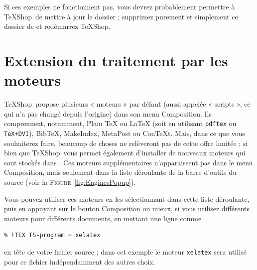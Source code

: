 \documentclass[11pt,french]{article}
\newcommand{\TS}{\textsf{\TeX Shop}}
\newcommand{\mnu}[1]{\textsf{#1}}
\begin{document}
Si ces exemples ne fonctionnent pas, vous devrez probablement permettre à \TS\ de mettre à jour le dossier  ; supprimez purement et simplement ce dossier de  et redémarrez \TS.



\section{Extension du traitement par les moteurs}%

\TS\ propose plusieurs « moteurs » par défaut (aussi appelée « scripts », ce qui n'a pas changé depuis l'origine) dans son menu \mnu{Composition}. Ils comprennent, notamment, \mnu{Plain TeX} ou \mnu{LaTeX} (soit en utilisant \texttt{pdftex} ou \texttt{TeX+DVI}), \mnu{BibTeX}, \mnu{MakeIndex}, \mnu{MetaPost} ou \mnu{ConTeXt}. Mais, dans ce que vous souhaiterez faire, beaucoup de choses ne relèveront pas de cette offre limitée ; si bien que \TS\ vous permet également d'installer de nouveaux moteurs qui sont stockés dans . Ces moteurs supplémentaires n'apparaissent pas dans le menu \mnu{Composition}, mais seulement dans la liste déroulante de la barre d'outils du source (voir la \textsc{Figure}~\ref{fig:EnginesPopup}).

Vous pouvez utiliser ces moteurs en les sélectionnant dans cette liste déroulante, puis en appuyant sur le bouton \mnu{Composition} ou mieux, si vous utilisez différents moteurs pour différents documents, en mettant une ligne comme

%
\begin{verbatim}
% !TEX TS-program = xelatex
\end{verbatim}
en tête de votre fichier source ; dans cet exemple le moteur \texttt{xelatex} sera utilisé pour ce fichier indépendamment des autres choix.
\end{document}
